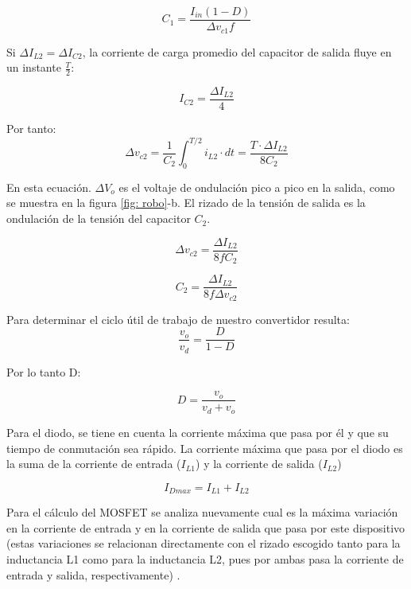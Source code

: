 \documentclass[conference]{IEEEtran}
\begin{document}
\begin{equation}
    C_1 =\frac{I_{in}(1-D)}{\Delta v_{c1}f}
\end{equation}

Si $\Delta I_{L2}=\Delta I_{C2}$, la corriente de carga promedio del capacitor de salida fluye en un instante $\frac{T}{2}$:

\begin{equation}
    I_{C2}=\frac{\Delta I_{L2}}{4}
\end{equation}

Por tanto:
\begin{equation}
    \Delta v_{c2}= \frac{1}{C_2} \int_{0}^{T/2} i_{L2} \cdot dt=\frac{T\cdot \Delta I_{L2}}{8C_2}
\end{equation}

En esta ecuación. $\Delta V_o$ es el voltaje de ondulación pico a pico en la salida, como se muestra en la figura \ref{fig: robo}-b. El rizado de la tensión de salida es la ondulación de la tensión del capacitor $C_2$.

\begin{equation}
     \Delta v_{c2}=\frac{\Delta I_{L2}}{8fC_2}
\end{equation}

\begin{equation}
    C_2=\frac{\Delta I_{L2}}{8f\Delta v_{c2}}
\end{equation}

Para determinar el ciclo útil de trabajo de nuestro convertidor resulta:
\begin{equation}
    \frac{v_o}{v_d}=\frac{D}{1-D}
\end{equation}

Por lo tanto D:

\begin{equation}
    D=\frac{v_o}{v_d+v_o}
\end{equation}

Para el diodo, se tiene en cuenta la corriente máxima que pasa por él y que su tiempo de conmutación sea rápido. La corriente máxima que pasa por el diodo es la suma de la corriente de entrada ($I_{L1}$) y la corriente de salida ($I_{L2}$)

\begin{equation}
    I_{Dmax}=I_{L1}+I_{L2}
\end{equation}

Para el cálculo del MOSFET se analiza nuevamente cual es la máxima variación en la corriente de entrada y en la corriente de salida que pasa por este dispositivo (estas variaciones se relacionan directamente con el rizado escogido tanto para la inductancia L1 como para la inductancia L2, pues por ambas pasa la corriente de entrada y salida, respectivamente) . 
\end{document}
